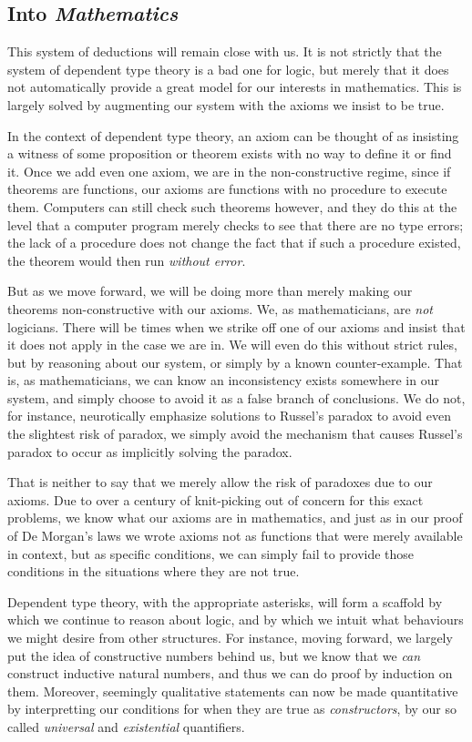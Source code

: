 \documentclass[11pt]{article}
\begin{document}
\subsection{Into \emph{Mathematics}}

This system of deductions will remain close with us. It is not strictly that the system of dependent type theory is a bad one for logic, but merely that it does not automatically provide a great model for our interests in mathematics. This is largely solved by augmenting our system with the axioms we insist to be true.

In the context of dependent type theory, an axiom can be thought of as insisting a witness of some proposition or theorem exists with no way to define it or find it. Once we add even one axiom, we are in the non-constructive regime, since if theorems are functions, our axioms are functions with no procedure to execute them. Computers can still check such theorems however, and they do this at the level that a computer program merely checks to see that there are no type errors; the lack of a procedure does not change the fact that if such a procedure existed, the theorem would then run \emph{without error}.

But as we move forward, we will be doing more than merely making our theorems non-constructive with our axioms. We, as mathematicians, are \emph{not} logicians. There will be times when we strike off one of our axioms and insist that it does not apply in the case we are in. We will even do this without strict rules, but by reasoning about our system, or simply by a known counter-example. That is, as mathematicians, we can know an inconsistency exists somewhere in our system, and simply choose to avoid it as a false branch of conclusions. We do not, for instance, neurotically emphasize solutions to Russel's paradox to avoid even the slightest risk of paradox, we simply avoid the mechanism that causes Russel's paradox to occur as implicitly solving the paradox.

That is neither to say that we merely allow the risk of paradoxes due to our axioms. Due to over a century of knit-picking out of concern for this exact problems, we know what our axioms are in mathematics, and just as in our proof of De Morgan's laws we wrote axioms not as functions that were merely available in context, but as specific conditions, we can simply fail to provide those conditions in the situations where they are not true.

Dependent type theory, with the appropriate asterisks, will form a scaffold by which we continue to reason about logic, and by which we intuit what behaviours we might desire from other structures. For instance, moving forward, we largely put the idea of constructive numbers behind us, but we know that we \emph{can} construct inductive natural numbers, and thus we can do proof by induction on them. Moreover, seemingly qualitative statements can now be made quantitative by interpretting our conditions for when they are true as \emph{constructors}, by our so called \emph{universal} and \emph{existential} quantifiers.
\end{document}
